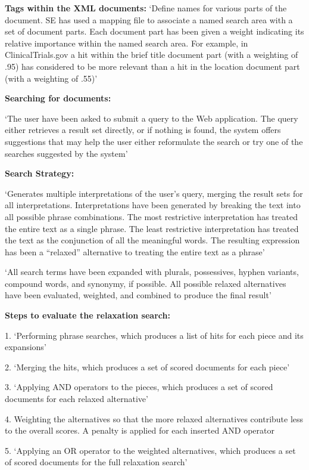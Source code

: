 \documentclass[]{article}
\begin{document}
{{\textbf{Tags within the XML documents:} ‘Define names for various parts of the document. SE has used a mapping file to associate a named search area with a set of document parts. Each document part has been given a weight indicating its relative importance within the named search area. For example, in ClinicalTrials.gov a hit within the brief title document part (with a weighting of .95) has considered to be more relevant than a hit in the location document part (with a weighting of .55)’

\textbf{Searching for documents:}

‘The user have been asked to submit a query to the Web application. The query either retrieves a result set directly, or if nothing is found, the system offers suggestions that may help the user either reformulate the search or try one of the searches suggested by the system’

\textbf{Search Strategy:}

‘Generates multiple interpretations of the user’s query, merging the result sets for all interpretations. Interpretations have been generated by breaking the text into all possible phrase combinations. The most restrictive interpretation has treated the entire text as a single phrase. The least restrictive interpretation has treated the text as the conjunction of all the meaningful words. The resulting expression has been a “relaxed” alternative to treating the entire text as a phrase’

‘All search terms have been expanded with plurals, possessives, hyphen variants, compound words, and synonymy, if possible. All possible relaxed alternatives have been evaluated, weighted, and combined to produce the final result’

\textbf{Steps to evaluate the relaxation search:} 

1.	‘Performing phrase searches, which produces a list of hits for each piece and its expansions’

2.	‘Merging the hits, which produces a set of scored documents for each piece’

3.	‘Applying AND operators to the pieces, which produces a set of scored documents for each relaxed alternative’

4.	Weighting the alternatives so that the more relaxed alternatives contribute less to the overall scores. A penalty is applied for each inserted AND operator

5.	‘Applying an OR operator to the weighted alternatives, which produces a set of scored documents for the full relaxation search’

}}
\end{document}
